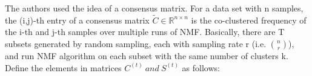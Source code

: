 \documentclass[11pt, oneside]{article}   	%
\begin{document}
\begin{Large}
The authors used the idea of a consensus matrix.  For a data set with n samples, the (i,j)-th entry of a consensus matrix $\tilde{C}\in\mathbb{R}^{n\times n}$ is the co-clustered frequency of the i-th and j-th samples over multiple runs of NMF.  Basically, there are T subsets generated by random sampling, each with sampling rate r (i.e. $n\choose r$), and run NMF algorithm on each subset with the same number of clusters k.  Define the elements in matrices $C^{(t)} \ and \ S^{(t)}$ as follows:\\





















\end{Large}
\end{document}
